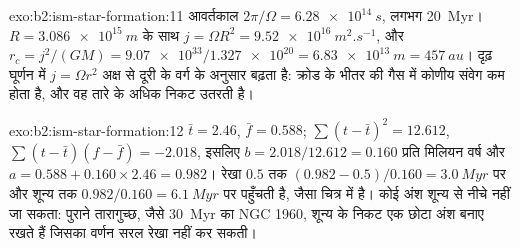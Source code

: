 \begin{solution}{exo:b2:ism-star-formation:11}
आवर्तकाल $2\pi/\Omega = \qty{6.28e14}{s}$, लगभग \qty{20}{Myr}।
$R = \qty{3.086e15}{m}$ के साथ $j = \Omega R^2 = \qty{9.52e16}{m^2.s^{-1}}$, और
$r_c = j^2/(GM) = \num{9.07e33}/\num{1.327e20} = \qty{6.83e13}{m} = \qty{457}{au}$।
दृढ़ घूर्णन में $j = \Omega r^2$ अक्ष से दूरी के वर्ग के अनुसार बढ़ता है:
क्रोड के भीतर की गैस में कोणीय संवेग कम होता है, और वह तारे के अधिक निकट उतरती है।
\end{solution}

\begin{solution}{exo:b2:ism-star-formation:12}
$\bar t = 2.46$, $\bar f = 0.588$; $\sum(t - \bar t)^2 = 12.612$,
$\sum(t - \bar t)(f - \bar f) = -2.018$, इसलिए $b = 2.018/12.612 = 0.160$ प्रति मिलियन
वर्ष और $a = 0.588 + 0.160\times2.46 = 0.982$। रेखा $0.5$ तक
$(0.982 - 0.5)/0.160 = \qty{3.0}{Myr}$ पर और शून्य तक $0.982/0.160 = \qty{6.1}{Myr}$ पर पहुँचती है, जैसा
चित्र में है। कोई अंश शून्य से नीचे नहीं जा सकता: पुराने तारागुच्छ, जैसे \qty{30}{Myr} का NGC 1960,
शून्य के निकट एक छोटा अंश बनाए रखते हैं जिसका वर्णन सरल रेखा नहीं कर सकती।
\end{solution}

